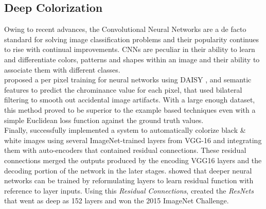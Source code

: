 \documentclass[oneside,a4paper,12pt]{report}
\begin{document}
\subsection{Deep Colorization}
\hspace*{0.25 in}Owing to recent advances, the Convolutional Neural Networks are a de facto standard for solving image classification problems and their popularity continues to rise with continual improvements. CNNs are peculiar in their ability to learn and differentiate colors, patterns and shapes within an image and their ability to associate them with different classes.\\
		\hspace*{0.25 in}\cite{cheng2016deep} proposed a per pixel training for neural networks using DAISY \citep{tola2008descriptor}, and semantic \citep{long2015semantic} features to predict the chrominance value for each pixel, that used bilateral filtering to smooth out accidental image artifacts. With a large enough dataset, this method proved to be superior to the example based techniques even with a simple Euclidean loss function against the ground truth values.\\
		\hspace*{0.25 in}Finally, \cite{dahl2016automatic} successfully implemented a system to automatically colorize black \& white images using several ImageNet-trained layers from VGG-16 \citep{simonyan2015deep} and integrating them with auto-encoders that contained residual connections. These residual connections merged the outputs produced by the encoding VGG16 layers and the decoding portion of the network in the later stages. \cite{he2015deep} showed that deeper neural networks can be trained by reformulating layers to learn residual function with reference to layer inputs. Using this \textit{Residual Connections}, \cite{he2015deep} created the \textit{ResNets} that went as deep as 152 layers and won the 2015 ImageNet Challenge.
\end{document}
